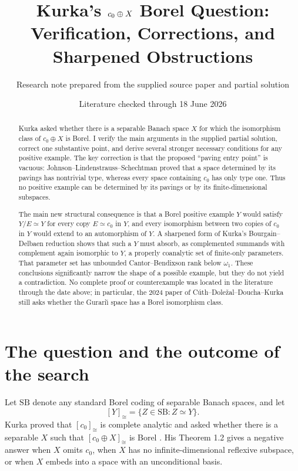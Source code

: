 \documentclass[11pt]{article}
\title{Kurka's \(\czer\oplus X\) Borel Question:\\
Verification, Corrections, and Sharpened Obstructions}
\author{Research note prepared from the supplied source paper and partial solution}
\date{Literature checked through 18 June 2026}
\theoremstyle{definition}
\newcommand{\czer}{c_0}
\newcommand{\iso}{\simeq}
\newcommand{\class}[1]{[#1]_{\cong}}
\begin{document}
\maketitle

\begin{abstract}
Kurka asked whether there is a separable Banach space \(X\) for which the
isomorphism class of \(\czer\oplus X\) is Borel.  I verify the main arguments
in the supplied partial solution, correct one substantive point, and derive
several stronger necessary conditions for any positive example.  The key
correction is that the proposed ``paving entry point'' is vacuous:
Johnson--Lindenstrauss--Schechtman proved that a space determined by its
pavings has nontrivial type, whereas every space containing \(\czer\) has only
type one.  Thus no positive example can be determined by its pavings or by its
finite-dimensional subspaces.

The main new structural consequence is that a Borel positive example \(Y\)
would satisfy \(Y/E\iso Y\) for every copy \(E\iso\czer\) in \(Y\), and every
isomorphism between two copies of \(\czer\) in \(Y\) would extend to an
automorphism of \(Y\).  A sharpened form of Kurka's Bourgain--Delbaen
reduction shows that such a \(Y\) must absorb, as complemented summands with
complement again isomorphic to \(Y\), a properly coanalytic set of finite-only
parameters.  That parameter set has unbounded Cantor--Bendixson rank below
\(\omega_1\).  These conclusions significantly narrow the shape of a
possible example, but they do not yield a contradiction.  No complete proof
or counterexample was located in the literature through the date above; in
particular, the 2024 paper of Cúth--Doležal--Doucha--Kurka still asks whether
the Gurari\u\i{} space has a Borel isomorphism class.
\end{abstract}

\section{The question and the outcome of the search}

Let \(\mathrm{SB}\) denote any standard Borel coding of separable Banach
spaces, and let
\[
  \class{Y}=\{Z\in\mathrm{SB}:Z\iso Y\}.
\]
Kurka proved that \(\class{\czer}\) is complete analytic and asked whether
there is a separable \(X\) such that \(\class{\czer\oplus X}\) is Borel
\cite{Kurka}.  His Theorem 1.2 gives a negative answer when \(X\) omits
\(\czer\), when \(X\) has no infinite-dimensional reflexive subspace, or when
\(X\) embeds into a space with an unconditional basis.
\end{document}
